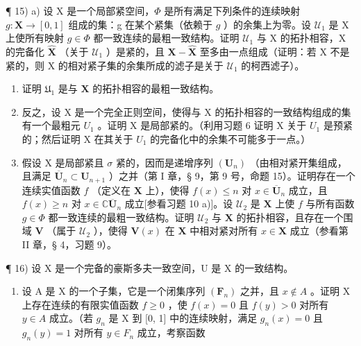 ¶ 15) a) 设 X 是一个局部紧空间，\(\Phi\) 是所有满足下列条件的连续映射 \(g: \mathbf{X} \to [\mathfrak{0}, \mathfrak{1}]\) 组成的集：g 在某个紧集（依赖于 \(g\) ）的余集上为零。设 \(\mathcal{U}_1\) 是 X 上使所有映射 \(g \in \Phi\) 都一致连续的最粗一致结构。证明 \(\mathcal{U}_1\) 与 X 的拓扑相容，X 的完备化 \(\hat{\mathbf{X}}\) （关于 \(\mathcal{U}_1\) ）是紧的，且 \(\mathbf{X} - \hat{\mathbf{X}}\) 至多由一点组成（证明：若 X 不是紧的，则 X 的相对紧子集的余集所成的滤子是关于 \(\mathcal{U}_1\) 的柯西滤子）。

\begin{enumerate}
\def\labelenumi{\alph{enumi})}
\setcounter{enumi}{1}
\item
  证明 \(\mathfrak{U}_1\) 是与 \(\mathbf{X}\) 的拓扑相容的最粗一致结构。
\item
  反之，设 X 是一个完全正则空间，使得与 X 的拓扑相容的一致结构组成的集有一个最粗元 \(U_{1}\) 。证明 X 是局部紧的。（利用习题 6 证明 X 关于 \(U_{1}\) 是预紧的；然后证明 X 在其关于 \(U_{1}\) 的完备化中的余集不可能多于一点。）
\item
  假设 X 是局部紧且 \(\sigma\) 紧的，因而是递增序列 \((\mathbf{U}_n)\) （由相对紧开集组成，且满足 \(\overline{\mathbf{U}}_n \subset \mathbf{U}_{n+1}\) ）之并（第 I 章，§ 9，第 9 号，命题 15）。证明存在一个连续实值函数 \(f\) （定义在 \(\mathbf{X}\) 上），使得 \(f(x) \leqslant n\) 对 \(x \in \overline{\mathbf{U}}_n\) 成立，且 \(f(x) \geqslant n\) 对 \(x \in \mathbb{C} \overline{\mathbf{U}}_n\) 成立{[}参看习题 10 a){]}。设 \(\mathcal{U}_2\) 是 \(\mathbf{X}\) 上使 \(f\) 与所有函数 \(g \in \Phi\) 都一致连续的最粗一致结构。证明 \(\mathcal{U}_2\) 与 \(\mathbf{X}\) 的拓扑相容，且存在一个围域 \(\mathbf{V}\) （属于 \(\mathcal{U}_2\) ），使得 \(\mathbf{V}(x)\) 在 \(\mathbf{X}\) 中相对紧对所有 \(x \in \mathbf{X}\) 成立（参看第 II 章，§ 4，习题 9）。
\end{enumerate}

¶ 16) 设 X 是一个完备的豪斯多夫一致空间，U 是 X 的一致结构。

\begin{enumerate}
\def\labelenumi{\alph{enumi})}
\tightlist
\item
  设 A 是 X 的一个子集，它是一个闭集序列 \((\mathbf{F}_{n})\) 之并，且 \(x \notin A\) 。证明 X 上存在连续的有限实值函数 \(f \geqslant 0\) ，使 \(f(x) = 0\) 且 \(f(y) > 0\) 对所有 \(y \in A\) 成立。（若 \(g_{n}\) 是 X 到 {[}0, 1{]} 中的连续映射，满足 \(g_{n}(x) = 0\) 且 \(g_{n}(y) = 1\) 对所有 \(y \in F_{n}\) 成立，考察函数
\end{enumerate}

